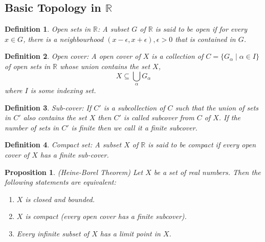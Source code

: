 \documentclass[12pt]{report}
\newtheorem{defn}{Definition}
\newtheorem{prop}{Proposition}
\begin{document}
\subsection*{Basic Topology in $\mathbb{R}$}
\begin{defn}
    Open sets in $\mathbb{R}$: A subset $G$ of $\mathbb{R}$ is said to be open if for every $x \in G$, there is a neighbourhood $(x -\epsilon, x+\epsilon), \epsilon > 0$ that is contained in $G$.
\end{defn}
\begin{defn}
    Open cover: A open cover of $X$ is a collection of $C = \{G_{\alpha} \mid \alpha \in I\}$ of open sets in $\mathbb{R}$ whose union contains the set $X$, $$ X \subseteq \bigcup\limits_{\alpha} G_{\alpha} $$ where $I$ is some indexing set.
\end{defn}
\begin{defn}
    Sub-cover: If $C'$ is a subcollection of $C$ such that the union of sets in $C'$ also contains the set $X$ then $C'$ is called subcover from $C$ of $X$. If the number of sets in $C'$ is finite then we call it a finite subcover. 
\end{defn}
\begin{defn}
    Compact set: A subset $X$ of $\mathbb{R}$ is said to be compact if every open cover of $X$ has a finite sub-cover. 
\end{defn}
\begin{prop}
    (Heine-Borel Theorem) Let $X$ be a set of real numbers. Then the following statements are equivalent:
    \begin{enumerate}
        \item $X$ is closed and bounded.
        \item $X$ is compact (every open cover has a finite subcover).
        \item Every infinite subset of $X$ has a limit point in $X$.
    \end{enumerate}
\end{prop}
\end{document}

